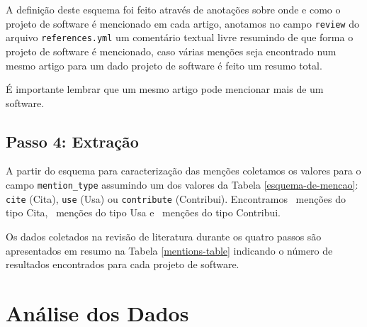 A definição deste esquema foi feito através de anotações sobre onde e como o
projeto de software é mencionado em cada artigo, anotamos no campo
\texttt{review} do arquivo \texttt{references.yml} um comentário textual livre
resumindo de que forma o projeto de software é mencionado, caso várias menções
seja encontrado num mesmo artigo para um dado projeto de software é feito um
resumo total.


É importante lembrar que um mesmo artigo pode mencionar
mais de um software.


\subsection{Passo 4: Extração}


A partir do esquema para caracterização das menções coletamos os valores para o
campo \texttt{mention\_type} assumindo um dos valores da Tabela
\ref{esquema-de-mencao}: \texttt{cite} (Cita), \texttt{use} (Usa) ou
\texttt{contribute} (Contribui). Encontramos \CiteCount \ menções do tipo Cita,
\UseCount \ menções do tipo Usa e
\ContributeCount \ menções do tipo Contribui.

Os dados coletados na revisão de literatura durante os quatro passos são
apresentados em resumo na Tabela \ref{mentions-table} indicando o
número de resultados encontrados para cada projeto de software.




\section{Análise dos Dados} \label{estudo2:analise} %

